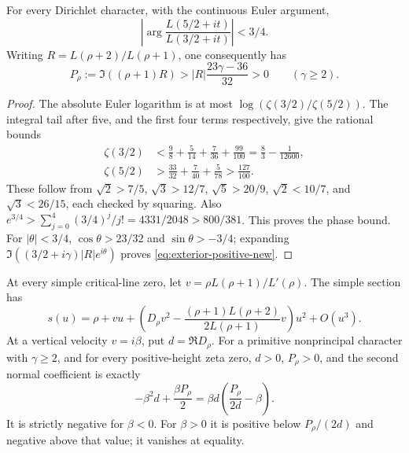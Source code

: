 \begin{lemma}
\label{lem:exterior-sector-new}
For every Dirichlet character, with the continuous Euler
argument,
\[
 \left|\arg\frac{L(5/2+it)}{L(3/2+it)}\right|<3/4.
\]
Writing $R=L(\rho+2)/L(\rho+1)$, one consequently has
\begin{equation}\label{eq:exterior-positive-new}
 P_\rho:=\Im((\rho+1)R)
       >|R|\frac{23\gamma-36}{32}>0\qquad(\gamma\ge2).
\end{equation}
\end{lemma}

\begin{proof}
The absolute Euler logarithm is at most
$\log(\zeta(3/2)/\zeta(5/2))$. The integral tail after five,
and the first four terms respectively, give the rational bounds
\[
 \begin{split}
 \zeta(3/2)&<\frac98+\frac5{14}+\frac7{36}+\frac{99}{100}
                =\frac83-\frac1{12600},\\
 \zeta(5/2)&>\frac{33}{32}+\frac7{40}+\frac5{78}
                >\frac{127}{100}.
 \end{split}
\]
These follow from $\sqrt2>7/5$, $\sqrt3>12/7$,
$\sqrt5>20/9$, $\sqrt2<10/7$, and $\sqrt3<26/15$,
each checked by squaring. Also
$e^{3/4}>\sum_{j=0}^4(3/4)^j/j!=4331/2048>800/381$.
This proves the phase bound. For $|\theta|<3/4$,
$\cos\theta>23/32$ and $\sin\theta>-3/4$;
expanding $\Im((3/2+i\gamma)|R|e^{i\theta})$
proves \eqref{eq:exterior-positive-new}.
\end{proof}

\begin{proposition}
\label{prop:simple-tangent-new}
At every simple critical-line zero, let
$v=\rho L(\rho+1)/L'(\rho)$. The simple section has
\begin{equation}\label{eq:simple-bending-jet-new}
 s(u)=\rho+vu+
 \left(D_\rho v^2-\frac{(\rho+1)L(\rho+2)}{2L(\rho+1)}v\right)u^2
 +O(u^3).
\end{equation}
At a vertical velocity $v=i\beta$, put $d=\Re D_\rho$.
For a primitive nonprincipal character with $\gamma\ge2$,
and for every positive-height zeta zero, $d>0$, $P_\rho>0$,
and the second normal coefficient is exactly
\[
       -\beta^2d+\frac{\beta P_\rho}{2}
       =\beta d\left(\frac{P_\rho}{2d}-\beta\right).
\]
It is strictly negative for $\beta<0$. For $\beta>0$ it is
positive below $P_\rho/(2d)$ and negative above that value;
it vanishes at equality.
\end{proposition}

